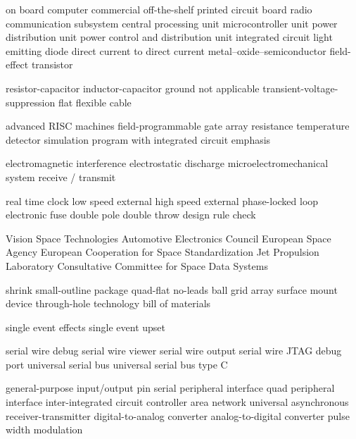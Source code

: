      {on board computer}
    {commercial off-the-shelf}
     {printed circuit board}
     {radio communication subsystem}
     {central processing unit}
     {microcontroller unit}
     {power distribution unit}
    {power control and distribution unit}
      {integrated circuit}
     {light emitting diode}
    {direct current to direct current}
  {metal–oxide–semiconductor field-effect transistor}

      {resistor-capacitor}
      {inductor-capacitor}
     {ground}
      {not applicable}
     {transient-voltage-suppression}
     {flat flexible cable}

     {advanced RISC machines}
    {field-programmable gate array}
     {resistance temperature detector}
   {simulation program with integrated circuit emphasis}

     {electromagnetic interference}
     {electrostatic discharge}
    {microelectromechanical system}
   {receive / transmit}

     {real time clock}
     {low speed external}
     {high speed external}
     {phase-locked loop}
   {electronic fuse}
    {double pole double throw}
     {design rule check}

     {Vision Space Technologies}
     {Automotive Electronics Council}
     {European Space Agency}
   {European Cooperation for Space Standardization}
     {Jet Propulsion Laboratory}
   {Consultative Committee for Space Data Systems}

    {shrink small-outline package}
     {quad-flat no-leads}
     {ball grid array}
     {surface mount device}
     {through-hole technology}
     {bill of materials}

     {single event effects}
     {single event upset}

     {serial wire debug}
     {serial wire viewer}
     {serial wire output}
  {serial wire JTAG debug port}
     {universal serial bus}
   {universal serial bus type C}

    {general-purpose input/output pin}
     {serial peripheral interface}
     {quad peripheral interface}
     {inter-integrated circuit}
     {controller area network}
    {universal asynchronous receiver-transmitter}
     {digital-to-analog converter}
     {analog-to-digital converter}
     {pulse width modulation}
